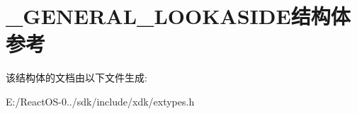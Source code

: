 \hypertarget{struct___g_e_n_e_r_a_l___l_o_o_k_a_s_i_d_e}{}\section{\+\_\+\+G\+E\+N\+E\+R\+A\+L\+\_\+\+L\+O\+O\+K\+A\+S\+I\+D\+E结构体 参考}
\label{struct___g_e_n_e_r_a_l___l_o_o_k_a_s_i_d_e}


该结构体的文档由以下文件生成\+:\begin{DoxyCompactItemize}
\item 
E\+:/\+React\+O\+S-\/0../sdk/include/xdk/extypes.\+h\end{DoxyCompactItemize}
